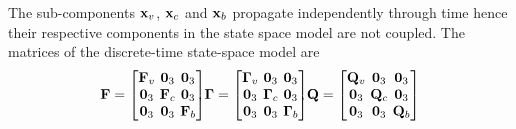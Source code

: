 The sub-components $\mathbf{x}_v$, $\mathbf{x}_c$ and $\mathbf{x}_b$ propagate independently through time hence their respective components in the state space model are not coupled.
The matrices of the discrete-time state-space model are
\begin{align} 
	\BoldF = \begin{bmatrix} \BoldF_v \dss & \0_3 \dss & \0_3 \\ \0_3 \dss & \BoldF_c \dss & \0_3 \\ \0_3 \dss & \0_3 \dss & \BoldF_b \end{bmatrix} \dss, 
	\BoldGamma = \begin{bmatrix} \BoldGamma_v \dss & \0_3 \dss & \0_3 \\ \0_3 \dss & \BoldGamma_c \dss & \0_3 \\ \0_3 \dss & \0_3 \dss & \BoldGamma_b \end{bmatrix} \dss, 
	\BoldQ = \begin{bmatrix} \BoldQ_v \dss & \0_3 \dss & \0_3 \\ \0_3 \dss & \BoldQ_c \dss & \0_3 \\ \0_3 \dss & \0_3 \dss & \BoldQ_b \end{bmatrix}
\end{align}

